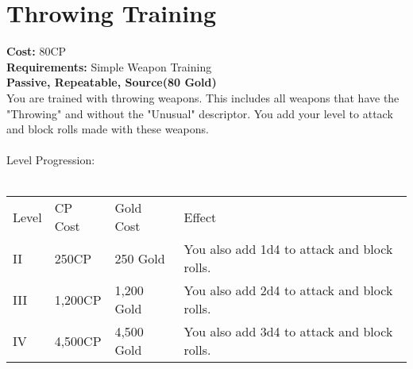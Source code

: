 \section{Throwing Training}\label{perk:throwingTraining}
\textbf{Cost:} 80CP\\
\textbf{Requirements:} Simple Weapon Training\\
\textbf{Passive, Repeatable, Source(80 Gold)}\\
You are trained with throwing weapons.
This includes all weapons that have the "Throwing" and without the "Unusual" descriptor.
You add your level to attack and block rolls made with these weapons.\\
\\
Level Progression:\\
\\
\begin{tabular}{l | l | l | l}
	Level & CP Cost & Gold Cost & Effect\\
	II & 250CP & 250 Gold & You also add 1d4 to attack and block rolls.\\
	III & 1,200CP & 1,200 Gold & You also add 2d4 to attack and block rolls.\\
	IV & 4,500CP & 4,500 Gold & You also add 3d4 to attack and block rolls.\\
\end{tabular}
